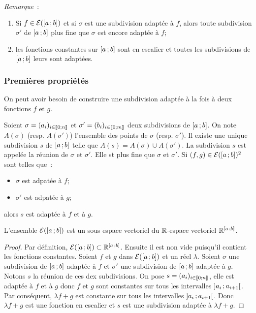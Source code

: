 \emph{Remarque}~:
\begin{enumerate}
\item Si \(f \in \mathcal{E}(\left[ a \, ;  b \right])\) et si \(\sigma\) est une subdivision adaptée à \(f\), alors toute subdivision \(\sigma'\) de \(\left[ a \, ;  b \right]\) plus fine que \(\sigma\) est encore adaptée à \(f\);
\item les fonctions constantes sur \(\left[ a \, ;  b \right]\) sont en escalier et toutes les subdivisions de \(\left[ a \, ;  b \right]\) leurs sont adaptées.
\end{enumerate}

\subsubsection{Premières propriétés}

On peut avoir besoin de construire une subdivision adaptée à la fois à deux fonctions \(f\) et \(g\).

Soient \(\sigma=(a_i)_{i \in \mathopen{\llbracket}0\mathclose{}\mathpunct{};n\mathclose{\rrbracket}}\) et \(\sigma'=(b_i)_{i \in \mathopen{\llbracket}0\mathclose{}\mathpunct{};m\mathclose{\rrbracket}}\) deux subdivisions de \(\left[ a \, ;  b \right]\). On note \(A(\sigma)\) (resp. \(A(\sigma')\)) l'ensemble des points de \(\sigma\) (resp. \(\sigma'\)). Il existe une unique subdivision \(s\) de \(\left[ a \, ;  b \right]\) telle que \(A(s)=A(\sigma) \cup A(\sigma')\). La subdivision \(s\) est appelée la réunion de \(\sigma\) et \(\sigma'\). Elle st plus fine que \(\sigma\) et \(\sigma'\). Si \((f,g) \in \mathcal{E}(\left[ a \, ;  b \right])^2\) sont telles que~:
\begin{itemize}
\item \(\sigma\) est adpatée à \(f\);
\item \(\sigma'\) est adpatée à \(g\);
\end{itemize}
alors \(s\) est adaptée à \(f\) et à \(g\).

\begin{prop}
  L'ensemble \(\mathcal{E}(\left[ a \, ;  b \right])\) est un sous espace vectoriel du \(\mathbb{R}\)-espace vectoriel \(\mathbb{R}^{\left[ a \, ;  b \right]}\).
\end{prop}
\begin{proof}
  Par définition, \(\mathcal{E}(\left[ a \, ;  b \right]) \subset \mathbb{R}^{\left[ a \, ;  b \right]}\). Ensuite il est non vide puisqu'il contient les fonctions constantes. Soient \(f\) et \(g\) dans \(\mathcal{E}(\left[ a \, ;  b \right])\) et un réel \(\lambda\). Soient \(\sigma\) une subdivision de \(\left[ a \, ;  b \right]\) adaptée à \(f\) et \(\sigma'\) une subdivision de \(\left[ a \, ;  b \right]\) adaptée à \(g\). Notons \(s\) la réunion de ces dex subdivisions. On pose \(s=(a_i)_{i \in \mathopen{\llbracket}0\mathclose{}\mathpunct{};n\mathclose{\rrbracket}}\), elle est adaptée à \(f\) et à \(g\) donc \(f\) et \(g\) sont constantes sur tous les intervalles \(\left] a_i \, ;  a_{i+1} \right[\). Par conséquent, \(\lambda f +g\) est constante sur tous les intervalles \(\left] a_i \, ;  a_{i+1} \right[\). Donc \(\lambda f +g\) est une fonction en escalier et \(s\) est une subdivision adaptée à \(\lambda f+g\).
\end{proof}

